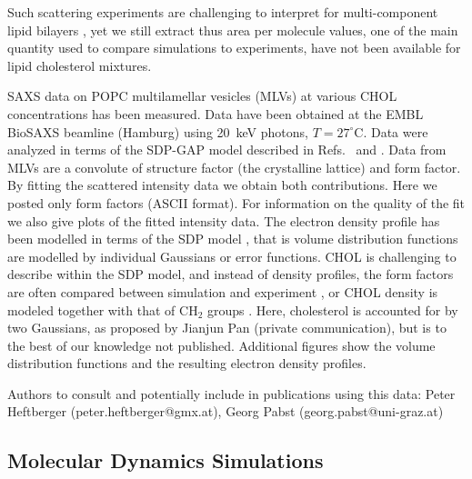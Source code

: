\documentclass[aps,prl,superscriptaddress]{revtex4-2}
\begin{document}
Such scattering experiments are challenging to interpret for multi-component lipid bilayers \cite{pan12,Heftberger15,Marquardt15}, yet we still extract 
thus area per molecule values, one of the main quantity used to
compare simulations to experiments, have not been
available for lipid cholesterol mixtures. 

SAXS data on POPC multilamellar vesicles (MLVs) at various CHOL concentrations has been measured. Data have been obtained at the EMBL BioSAXS beamline (Hamburg) using 20~keV photons, $T=27^\circ$C. Data were analyzed in terms of the SDP-GAP model described in Refs.~ and . Data from MLVs are a convolute of structure factor (the crystalline lattice) and form factor. By fitting the scattered intensity data we obtain both contributions. Here we posted only form factors (ASCII format). For information on the quality of the fit we also give plots of the fitted intensity data. The electron density profile has been modelled in terms of the SDP model \cite{heberle12,Kucerka08a,kucerka12}, that is volume distribution functions are modelled by individual Gaussians or error functions. CHOL is challenging to describe within the SDP model, and instead of density profiles, the form factors are often compared between simulation and experiment \cite{Kucerka08b}, or CHOL density is modeled together with that of CH$_2$ groups \cite{pan12}. Here, cholesterol is accounted for by two Gaussians, as proposed by Jianjun Pan (private communication), but is to the best of our knowledge not published.
Additional figures show the volume distribution functions and the resulting electron density profiles.

Authors to consult and potentially include in publications using this data: Peter Heftberger (peter.heftberger@gmx.at), Georg Pabst (georg.pabst@uni-graz.at)

\subsection{Molecular Dynamics Simulations}
\end{document}

